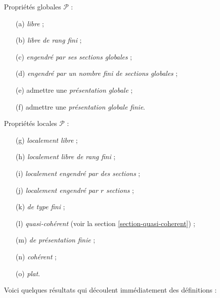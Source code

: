 \medskip\noindent
Propriétés globales $\mathcal{P}$ :
\begin{enumerate}
\item[(a)] {\it libre} ;
\item[(b)] {\it libre de rang fini} ;
\item[(c)] {\it engendré par ses sections globales} ;
\item[(d)] {\it engendré par un nombre fini de sections globales} ;
\item[(e)] admettre une {\it présentation globale} ;
\item[(f)] admettre une {\it présentation globale finie}.
\end{enumerate}
Propriétés locales $\mathcal{P}$ :
\begin{enumerate}
\item[(g)] {\it localement libre} ;
\item[(h)] {\it localement libre de rang fini} ;
\item[(i)] {\it localement engendré par des sections} ;
\item[(j)] {\it localement engendré par $r$ sections} ;
\item[(k)] {\it de type fini} ;
\item[(l)] {\it quasi-cohérent} (voir la section \ref{section-quasi-coherent}) ;
\item[(m)] {\it de présentation finie} ;
\item[(n)] {\it cohérent} ;
\item[(o)] {\it plat}.
\end{enumerate}
Voici quelques résultats qui découlent immédiatement des définitions :

